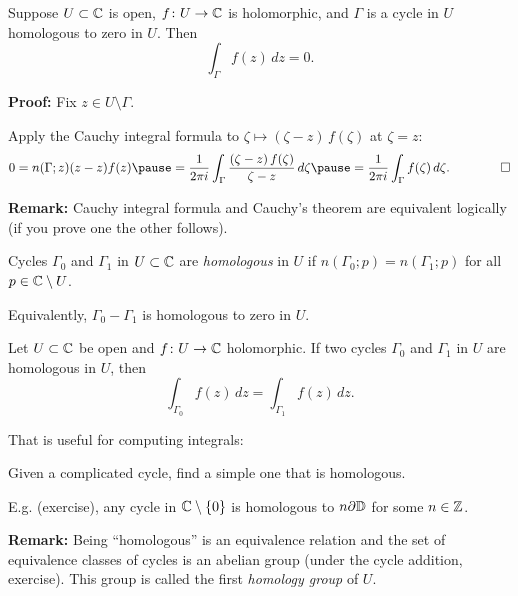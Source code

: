 \documentclass[10pt,aspectratio=169]{beamer}
\begin{document}
\begin{frame}

\begin{theorem}
Suppose $U \subset {\mathbb{C}}$ is open,
$f \colon U \to {\mathbb{C}}$ is holomorphic,
and $\Gamma$ is
a cycle
in $U$
homologous to zero in $U$.
Then
\begin{equation*}
\int_\Gamma f(z) \, dz = 0 .
\end{equation*}
\end{theorem}

\pause

\textbf{Proof:}
Fix $z \in U \setminus \Gamma$.

\medskip
\pause
Apply 
the Cauchy integral formula to $\zeta \mapsto (\zeta-z)\,f(\zeta)$ at $\zeta=z$:
\pause
\[
0 = n(\Gamma;z) (z-z)f(z)
\pause
=
\frac{1}{2\pi i} \int_\Gamma \frac{(\zeta-z)\,f(\zeta)}{\zeta-z} \, d\zeta
\pause
=
\frac{1}{2\pi i} \int_\Gamma f(\zeta) \, d\zeta .
\qquad
\qed
\]

\pause

\textbf{Remark:} Cauchy integral formula and Cauchy's theorem are equivalent
logically (if you prove one the other follows).

\end{frame}

\begin{frame}

\begin{definition}
Cycles
$\Gamma_0$ and $\Gamma_1$ in $U
\subset {\mathbb{C}}$ are \emph{homologous} in $U$
if $n(\Gamma_0;p) = n(\Gamma_1;p)$ for all $p \in {\mathbb{C}} \setminus U$.
\end{definition}

Equivalently, $\Gamma_0-\Gamma_1$ is homologous to zero in $U$.

\pause

\begin{corollary}
Let $U \subset {\mathbb{C}}$ be open and $f \colon U \to {\mathbb{C}}$ holomorphic.
If two cycles
$\Gamma_0$ and $\Gamma_1$ in $U$
are homologous in $U$, then
\begin{equation*}
\int_{\Gamma_0} f(z)\, dz = 
\int_{\Gamma_1} f(z)\, dz .
\end{equation*}
\end{corollary}

\pause

That is useful for computing integrals:

Given a complicated cycle, find a
simple one that is homologous.

\pause
\medskip

E.g. (exercise), any cycle in ${\mathbb{C}} \setminus \{ 0 \}$ is homologous to
$n \partial {\mathbb{D}}$ for some $n \in {\mathbb{Z}}$.

\pause
\medskip

\textbf{Remark:} Being ``homologous'' is an equivalence relation and the set of 
equivalence classes of cycles is an abelian group (under the cycle addition,
exercise).  This group is called the
first \emph{homology group} of $U$.
\end{frame}
\end{document}
